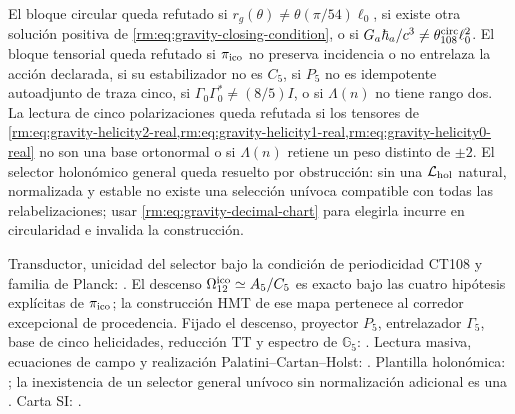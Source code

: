 \begin{falsifier}
El bloque circular queda refutado si
\(r_g(\theta)\neq\theta(\pi/54)\ell_0\), si existe otra soluci\'on positiva
de \cref{rm:eq:gravity-closing-condition}, o si
\(G_a\hbar_a/c^3\neq\theta_{108}^{\rm circ}\ell_0^2\). El bloque tensorial queda
refutado si \(\pi_{\rm ico}\) no preserva incidencia o no entrelaza la
acci\'on declarada, si su estabilizador no es \(C_5\), si \(P_5\) no es
idempotente autoadjunto de traza cinco, si
\(\Gamma_0\Gamma_0^*\neq(8/5)I\), o si \(\Lambda(n)\) no tiene rango dos.
La lectura de cinco polarizaciones queda refutada si los tensores de
\cref{rm:eq:gravity-helicity2-real,rm:eq:gravity-helicity1-real,rm:eq:gravity-helicity0-real}
no son una base ortonormal o si \(\Lambda(n)\) retiene un peso distinto de
\(\pm2\).
El selector holon\'omico general queda resuelto por obstrucci\'on: sin una
\(\mathcal L_{\rm hol}\) natural, normalizada y estable no existe una
selecci\'on un\'ivoca compatible con todas las relabelizaciones; usar
\cref{rm:eq:gravity-decimal-chart} para elegirla incurre en circularidad e
invalida la construcci\'on.
\end{falsifier}

\begin{statusbox}
Transductor, unicidad del selector bajo la condici\'on de periodicidad CT108 y
familia de Planck: .
El descenso \(\Omega_{12}^{\rm ico}\simeq A_5/C_5\) es exacto bajo las cuatro
hip\'otesis expl\'icitas de \(\pi_{\rm ico}\); la construcci\'on HMT de ese
mapa pertenece al corredor excepcional de procedencia. Fijado el descenso,
proyector \(P_5\), entrelazador \(\Gamma_5\), base de cinco helicidades,
reducci\'on TT y espectro de \(\mathbb G_5\): .
Lectura masiva, ecuaciones de campo y realizaci\'on
Palatini--Cartan--Holst: . Plantilla
holon\'omica: ; la inexistencia de un
selector general un\'ivoco sin normalizaci\'on adicional es una
. Carta SI:
.
\end{statusbox}
